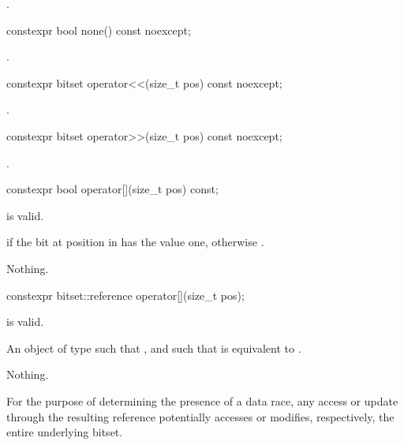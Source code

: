 \begin{itemdescr}
\pnum
\returns
{}.
\end{itemdescr}

%
\begin{itemdecl}
constexpr bool none() const noexcept;
\end{itemdecl}

\begin{itemdescr}
\pnum
\returns
{}.
\end{itemdescr}

%
\begin{itemdecl}
constexpr bitset operator<<(size_t pos) const noexcept;
\end{itemdecl}

\begin{itemdescr}
\pnum
\returns
{}.
\end{itemdescr}

%
\begin{itemdecl}
constexpr bitset operator>>(size_t pos) const noexcept;
\end{itemdecl}

\begin{itemdescr}
\pnum
\returns
{}.
\end{itemdescr}

%
\begin{itemdecl}
constexpr bool operator[](size_t pos) const;
\end{itemdecl}

\begin{itemdescr}
\pnum
\expects
{} is valid.

\pnum
\returns
{} if the bit at position  in  has the value
one, otherwise .

\pnum
\throws
Nothing.
\end{itemdescr}

%
\begin{itemdecl}
constexpr bitset::reference operator[](size_t pos);
\end{itemdecl}

\begin{itemdescr}
\pnum
\expects
{} is valid.

\pnum
\returns
An object of type
such that
,
and such that
is equivalent to
.

\pnum
\throws
Nothing.

\pnum
\remarks
For the purpose of determining the presence of a data
race, any access or update through the resulting
reference potentially accesses or modifies, respectively, the entire
underlying bitset.
\end{itemdescr}

